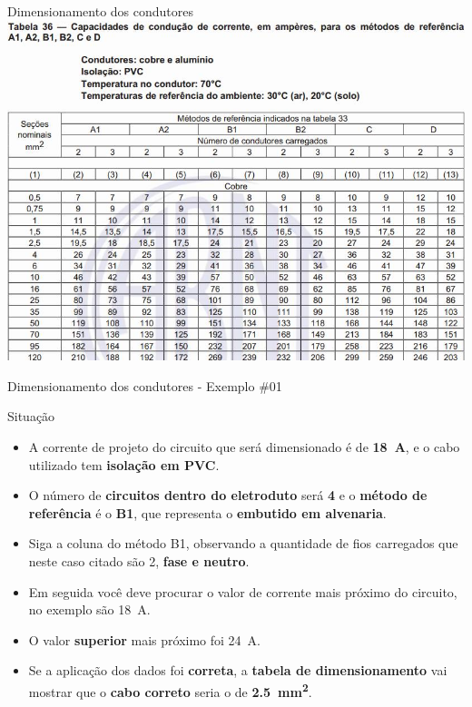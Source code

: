 
\begin{frame}{Dimensionamento dos condutores}
	\centering
	\includegraphics[width=0.85\linewidth]{Figuras/Ch06/fig4}
\end{frame}


\begin{frame}{Dimensionamento dos condutores - Exemplo \#01}
	\begin{block}{Situação}
		\begin{itemize}
			\item A corrente de projeto do circuito que será dimensionado é de \textbf{\SI{18}{\ampere}}, e o cabo utilizado tem \textbf{isolação em PVC}.
			\item O número de \textbf{circuitos dentro do eletroduto} será \textbf{4} e o \textbf{método de referência} é o \textbf{B1}, que representa o \textbf{embutido em alvenaria}.
			\item Siga a coluna do método B1, observando a quantidade de fios carregados que neste caso citado são 2, \textbf{fase e neutro}.
			\item Em seguida você deve procurar o valor de corrente mais próximo do circuito, no exemplo são \SI{18}{\ampere}.
			\item O valor \textbf{superior} mais próximo foi \SI{24}{\ampere}.
			\item Se a aplicação dos dados foi \textbf{correta}, a \textbf{tabela de dimensionamento} vai mostrar que o \textbf{cabo correto} seria o de \textbf{\SI{2.5}{\milli\meter\squared}}.
		\end{itemize}
	\end{block}
\end{frame}


